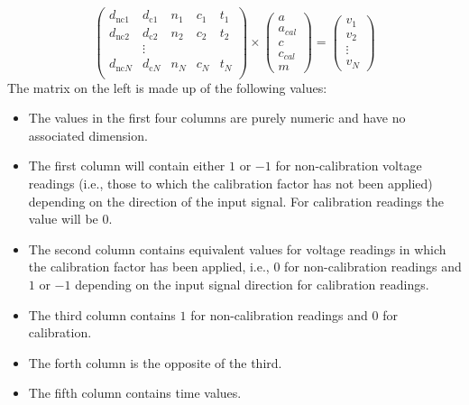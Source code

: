 \documentclass{IMEKO2024}
\begin{document}

\[
\begin{pmatrix*}
  d_{\textrm{nc}1} & d_{\textrm{c}1} & n_1 & c_1 & t_1  \\
  d_{\textrm{nc}2} & d_{\textrm{c}2} & n_2 & c_2 & t_2  \\
   & \vdots &  & & \\
  d_{\textrm{nc}N} & d_{\textrm{c}N} & n_N & c_N & t_N  \\
\end{pmatrix*}
\times
\begin{pmatrix}
  a \\
  a_{cal} \\
  c \\
  c_{cal} \\
  m
\end{pmatrix}
=
\begin{pmatrix}
  v_1 \\
  v_2 \\
  \vdots \\
  v_N
\end{pmatrix}
\]
%
The matrix on the left is made up of the following values:
%
\begin{itemize}
    \item The values in the first four columns are purely numeric and have no associated dimension.

    \item The first column will contain either $1$ or $-1$ for non-calibration voltage readings (i.e., those to which the calibration factor has not been applied) depending on the direction of the input signal. For calibration readings the value will be $0$.

    \item The second column contains equivalent values for voltage readings in which the calibration factor has been applied, i.e., $0$ for non-calibration readings and $1$ or $-1$ depending on the input signal direction for calibration readings.

    \item The third column contains $1$ for non-calibration readings and $0$ for calibration.

    \item The forth column is the opposite of the third.

    \item The fifth column contains time values.
\end{itemize}
\end{document}
